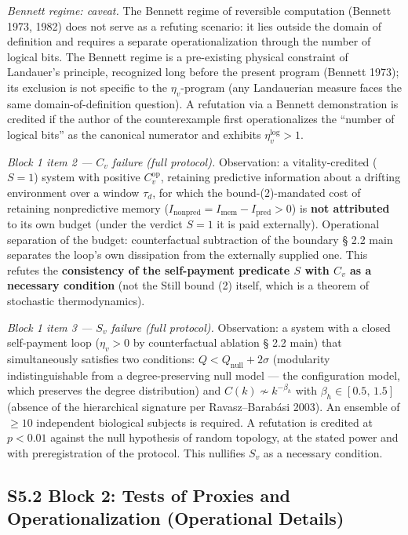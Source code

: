 \documentclass[pdflatex,sn-mathphys-ay]{sn-jnl}
\begin{document}
\emph{Bennett regime: caveat.} The Bennett regime of reversible computation (Bennett 1973, 1982) does not serve as a refuting scenario: it lies outside the domain of definition and requires a separate operationalization through the number of logical bits. The Bennett regime is a pre-existing physical constraint of Landauer's principle, recognized long before the present program (Bennett 1973); its exclusion is not specific to the \(\eta_v\)-program (any Landauerian measure faces the same domain-of-definition question). A refutation via a Bennett demonstration is credited if the author of the counterexample first operationalizes the ``number of logical bits'' as the canonical numerator and exhibits \(\eta_v^{\text{log}} > 1\).

\emph{Block 1 item 2 --- \(C_v\) failure (full protocol).} Observation: a vitality-credited (\(S = 1\)) system with positive \(C_v^{\text{op}}\), retaining predictive information about a drifting environment over a window \(\tau_d\), for which the bound-(2)-mandated cost of retaining nonpredictive memory (\(I_{\text{nonpred}} = I_{\text{mem}} - I_{\text{pred}} > 0\)) is \textbf{not attributed} to its own budget (under the verdict \(S = 1\) it is paid externally). Operational separation of the budget: counterfactual subtraction of the boundary § 2.2 main separates the loop's own dissipation from the externally supplied one. This refutes the \textbf{consistency of the self-payment predicate \(S\) with \(C_v\) as a necessary condition} (not the Still bound (2) itself, which is a theorem of stochastic thermodynamics).

\emph{Block 1 item 3 --- \(S_v\) failure (full protocol).} Observation: a system with a closed self-payment loop (\(\eta_v > 0\) by counterfactual ablation § 2.2 main) that simultaneously satisfies two conditions: \(Q < Q_{\text{null}} + 2\sigma\) (modularity indistinguishable from a degree-preserving null model --- the configuration model, which preserves the degree distribution) and \(C(k) \not\sim k^{-\beta_h}\) with \(\beta_h \in [0.5,\, 1.5]\) (absence of the hierarchical signature per Ravasz--Barabási 2003). An ensemble of \(\ge 10\) independent biological subjects is required. A refutation is credited at \(p < 0.01\) against the null hypothesis of random topology, at the stated power and with preregistration of the protocol. This nullifies \(S_v\) as a necessary condition.

\subsection*{S5.2 Block 2: Tests of Proxies and Operationalization (Operational Details)}\label{s5.2-block-2-tests-of-proxies-and-operationalization-operational-details}
\end{document}
